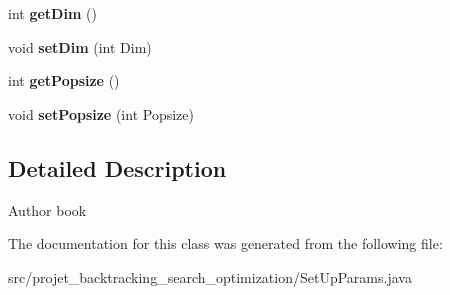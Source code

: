 \begin{DoxyCompactItemize}
int {\bfseries get\+Dim} ()
\item 
\mbox{\label{classprojet__backtracking__search__optimization_1_1_set_up_params_ab818523b67bd563e205f5de90340048f}} 
void {\bfseries set\+Dim} (int Dim)
\item 
\mbox{\label{classprojet__backtracking__search__optimization_1_1_set_up_params_a3b35f97532c1d3ac7382e72791712045}} 
int {\bfseries get\+Popsize} ()
\item 
\mbox{\label{classprojet__backtracking__search__optimization_1_1_set_up_params_a6c12251cb4c65afc815577d8db5a8732}} 
void {\bfseries set\+Popsize} (int Popsize)
\end{DoxyCompactItemize}


\subsection{Detailed Description}
\begin{DoxyAuthor}{Author}
book 
\end{DoxyAuthor}


The documentation for this class was generated from the following file\+:\begin{DoxyCompactItemize}
\item 
src/projet\+\_\+backtracking\+\_\+search\+\_\+optimization/Set\+Up\+Params.\+java\end{DoxyCompactItemize}
